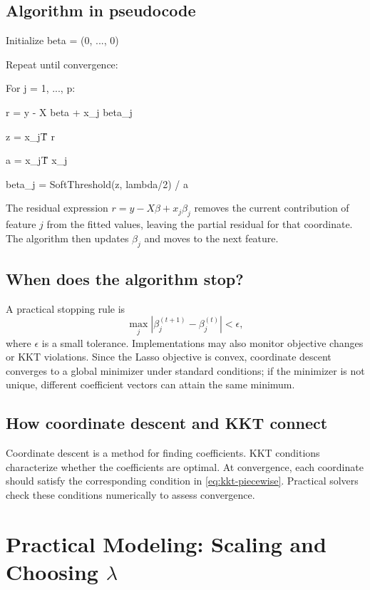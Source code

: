 \documentclass[11pt,a4paper]{article}
\numberwithin{equation}{section}
\newcommand{\abs}[1]{\left|#1\right|}
\begin{document}
\subsection{Algorithm in pseudocode}
\begin{tcolorbox}[colback=black!3,colframe=Muted!70,arc=2mm,boxrule=.5pt]
\ttfamily\small
Initialize beta = (0, ..., 0)\par
Repeat until convergence:\par
\quad For j = 1, ..., p:\par
\qquad r = y - X beta + x\_j beta\_j\par
\qquad z = x\_j\^T r\par
\qquad a = x\_j\^T x\_j\par
\qquad beta\_j = SoftThreshold(z, lambda/2) / a\par
\end{tcolorbox}
The residual expression $r=y-X\beta+x_j\beta_j$ removes the current contribution of feature $j$ from the fitted values, leaving the partial residual for that coordinate. The algorithm then updates $\beta_j$ and moves to the next feature.

\subsection{When does the algorithm stop?}
A practical stopping rule is
\begin{equation}
  \max_j\abs{\beta_j^{(t+1)}-\beta_j^{(t)}}<\epsilon,
\end{equation}
where $\epsilon$ is a small tolerance. Implementations may also monitor objective changes or KKT violations. Since the Lasso objective is convex, coordinate descent converges to a global minimizer under standard conditions; if the minimizer is not unique, different coefficient vectors can attain the same minimum.

\subsection{How coordinate descent and KKT connect}
Coordinate descent is a method for finding coefficients. KKT conditions characterize whether the coefficients are optimal. At convergence, each coordinate should satisfy the corresponding condition in \cref{eq:kkt-piecewise}. Practical solvers check these conditions numerically to assess convergence.

\section{Practical Modeling: Scaling and Choosing $\lambda$}
\end{document}
